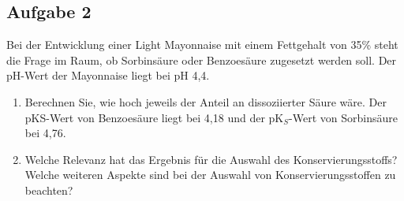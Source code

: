 \documentclass[a4paper,11pt]{article}
\newif\ifshowme
\begin{document}
\subsection*{Aufgabe 2}
Bei der Entwicklung einer Light Mayonnaise mit einem Fettgehalt von 35\% steht die Frage im
Raum, ob Sorbinsäure oder Benzoesäure zugesetzt werden soll. Der pH-Wert der Mayonnaise
liegt bei pH 4,4.
\begin{enumerate}[label=\alph*)]
\item Berechnen Sie, wie hoch jeweils der Anteil an dissoziierter Säure wäre. Der pKS-Wert
von Benzoesäure liegt bei 4,18 und der pK$_S$-Wert von Sorbinsäure bei 4,76.

\ifshowme
\antwort{

Säurekonstante nach Dissoziationsgrad $\alpha$ umstellen:
\begin{align*}
K &= \frac{[H^+] \cdot [A^-]}{[HA]} \\
K &= \frac{[H^+] \cdot \alpha}{1 - \alpha} \\
K \cdot (1-\alpha) & = [H^+] \cdot \alpha \\
K - \alpha \cdot K &= [H^+] \cdot \alpha \\
K &= [H^+] \cdot \alpha + \alpha \cdot K \\
K &= \alpha \cdot ([H^+] + K) \\
\alpha &= \frac{K}{[H^+] + K}
\end{align*}
Nun können wir einfach einsetzen mit $K= 10^{-pK_S}$ und $[H^+] = 10^{-pH}$ \pp

\textbf{Benzoesäure:}
\begin{align*}
\alpha &= \frac{10^{-4,18}}{10^{-4,4} + 10^{-4,18}} \\
&= 0,624
\end{align*}
Daher liegt der Anteil an undissoziierter Säure bei 1-0,624 = 0,3759 \RA 37,6 \%
\pp 
\textbf{Sorbinsäure:}
\begin{align*}
\alpha &= \frac{10^{-4,76}}{10^{-4,4} + 10^{-4,76}} \\
&= 0,303
\end{align*}
Daher liegt der Anteil an undissoziierter Säure bei 1-0,303 = 0,697 \RA 69,7 \%
}
\pagebreak
\else
\fi

\item Welche Relevanz hat das Ergebnis für die Auswahl des Konservierungsstoffs? Welche
weiteren Aspekte sind bei der Auswahl von Konservierungsstoffen zu beachten?
\ifshowme
{}
\end{enumerate}
\end{document}
